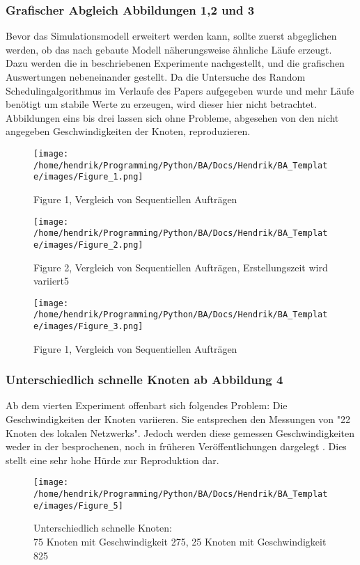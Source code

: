 \subsubsection{Grafischer Abgleich Abbildungen 1,2 und 3}
Bevor das Simulationsmodell erweitert werden kann, sollte zuerst abgeglichen werden, ob das nach gebaute Modell näherungsweise ähnliche Läufe erzeugt. Dazu werden die in \cite{Arn99} beschriebenen Experimente nachgestellt, und die grafischen Auswertungen nebeneinander gestellt.
Da die Untersuche des Random Schedulingalgorithmus im Verlaufe des Papers aufgegeben wurde und mehr Läufe benötigt um stabile Werte zu erzeugen, wird dieser hier nicht betrachtet.\\
Abbildungen eins bis drei lassen sich ohne Probleme, abgesehen von den nicht angegeben Geschwindigkeiten der Knoten, reproduzieren.
\begin{figure}
\centering
\texttt{[image: /home/hendrik/Programming/Python/BA/Docs/Hendrik/BA\_Template/images/Figure\_1.png]}
\caption{Figure 1, Vergleich von Sequentiellen Aufträgen}
\label{figure1}
\end{figure}
\begin{figure}
	\centering
	\texttt{[image: /home/hendrik/Programming/Python/BA/Docs/Hendrik/BA\_Template/images/Figure\_2.png]}
	\caption{Figure 2, Vergleich von Sequentiellen Aufträgen, Erstellungszeit wird variiert5}
	\label{figure1}
\end{figure}
\begin{figure}
	\centering
	\texttt{[image: /home/hendrik/Programming/Python/BA/Docs/Hendrik/BA\_Template/images/Figure\_3.png]}
	\caption{Figure 1, Vergleich von Sequentiellen Aufträgen}
	\label{figure3}
\end{figure}

\FloatBarrier

\subsubsection{Unterschiedlich schnelle Knoten ab Abbildung 4}
Ab dem vierten Experiment offenbart sich folgendes Problem: Die Geschwindigkeiten der Knoten variieren. Sie entsprechen den Messungen von "22 Knoten des lokalen Netzwerks". Jedoch werden diese gemessen Geschwindigkeiten weder in der besprochenen, noch in früheren Veröffentlichungen dargelegt \cite{norepr1,norepr2}. Dies stellt eine sehr hohe Hürde zur Reproduktion dar.\\

\begin{figure}
	\centering
	\texttt{[image: /home/hendrik/Programming/Python/BA/Docs/Hendrik/BA\_Template/images/Figure\_5]}
	\caption{Unterschiedlich schnelle Knoten:\\
	75 Knoten mit Geschwindigkeit 275, 25 Knoten mit Geschwindigkeit 825}
	\label{figure5}
\end{figure}

